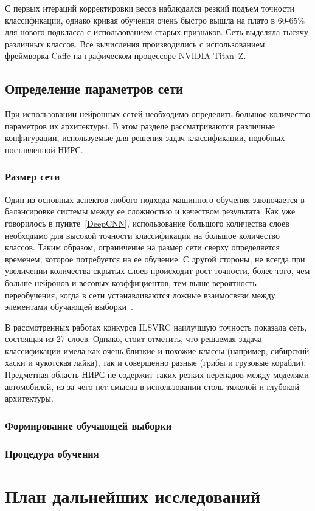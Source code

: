 \documentclass[a4paper,14pt]{extarticle} %
\begin{document}
С первых итераций корректировки весов наблюдался резкий подъем точности классификации, однако кривая обучения очень быстро вышла на плато в 60-65\% для нового подкласса с использованием старых признаков. Сеть выделяла тысячу различных классов. Все вычисления производились с использованием фреймворка Caffe на графическом процессоре NVIDIA Titan~Z.

\subsection{Определение параметров сети}
\hspace{\parindent} При использовании нейронных сетей необходимо определить большое количество параметров их архитектуры. В этом разделе рассматриваются различные конфигурации, используемые для решения задач классификации, подобных поставленной НИРС.

\subsubsection{Размер сети}
\hspace{\parindent} Один из основных аспектов любого подхода машинного обучения заключается в балансировке системы между ее сложностью и качеством результата. Как уже говорилось в пункте~\ref{DeepCNN}, использование большого количества слоев необходимо для высокой точности классификации на большое количество классов. Таким образом, ограничение на размер сети сверху определяется временем, которое потребуется на ее обучение. С другой стороны, не всегда при увеличении количества скрытых слоев происходит рост точности, более того, чем больше нейронов и весовых коэффициентов, тем выше вероятность переобучения, когда в сети устанавливаются ложные взаимосвязи между элементами обучающей выборки~\cite{NNsize}.

В рассмотренных работах конкурса ILSVRC наилучшую точность показала сеть, состоящая из 27 слоев. Однако, стоит отметить, что решаемая задача классификации имела как очень близкие и похожие классы (например, сибирский хаски и чукотская лайка), так и совершенно разные (грибы и грузовые корабли). Предметная область НИРС не содержит таких резких перепадов между моделями автомобилей, из-за чего нет смысла в использовании столь тяжелой  и глубокой архитектуры.



\subsubsection{Формирование обучающей выборки}

\subsubsection{Процедура обучения}

\section{План дальнейших исследований}
\hspace{\parindent} 

%
\newpage
\begin{flushleft}
\end{flushleft}
\end{document}
